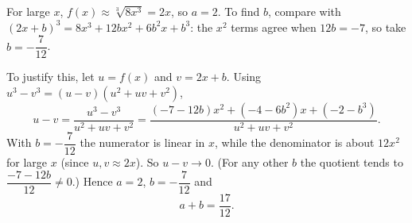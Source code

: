 For large $x$, $f(x)\approx\sqrt[3]{8x^3}=2x$, so $a=2$. To find $b$, compare with $(2x+b)^3=8x^3+12bx^2+6b^2x+b^3$: the $x^2$ terms agree when $12b=-7$, so take $b=-\dfrac{7}{12}$.

To justify this, let $u=f(x)$ and $v=2x+b$. Using $u^3-v^3=(u-v)(u^2+uv+v^2)$,
\[
u-v=\dfrac{u^3-v^3}{u^2+uv+v^2}=\dfrac{(-7-12b)x^2+(-4-6b^2)x+(-2-b^3)}{u^2+uv+v^2}.
\]
With $b=-\dfrac{7}{12}$ the numerator is linear in $x$, while the denominator is about $12x^2$ for large $x$ (since $u,v\approx2x$). So $u-v\to0$. (For any other $b$ the quotient tends to $\dfrac{-7-12b}{12}\ne0$.) Hence $a=2$, $b=-\dfrac{7}{12}$ and
\[
a+b=\boxed{\dfrac{17}{12}} .
\]
